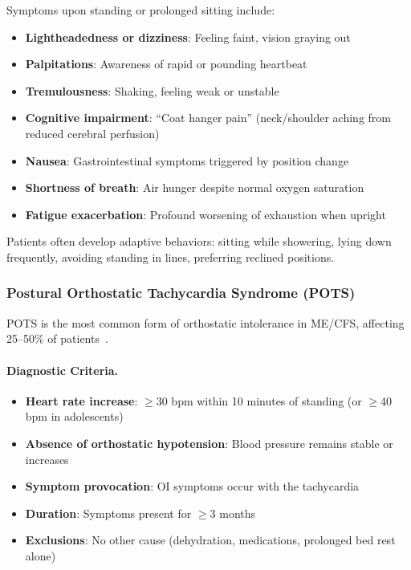 Symptoms upon standing or prolonged sitting include:
\begin{itemize}
    \item \textbf{Lightheadedness or dizziness}: Feeling faint, vision graying out
    \item \textbf{Palpitations}: Awareness of rapid or pounding heartbeat
    \item \textbf{Tremulousness}: Shaking, feeling weak or unstable
    \item \textbf{Cognitive impairment}: ``Coat hanger pain'' (neck/shoulder aching from reduced cerebral perfusion)
    \item \textbf{Nausea}: Gastrointestinal symptoms triggered by position change
    \item \textbf{Shortness of breath}: Air hunger despite normal oxygen saturation
    \item \textbf{Fatigue exacerbation}: Profound worsening of exhaustion when upright
\end{itemize}

Patients often develop adaptive behaviors: sitting while showering, lying down frequently, avoiding standing in lines, preferring reclined positions.

\subsubsection{Postural Orthostatic Tachycardia Syndrome (POTS)}

POTS is the most common form of orthostatic intolerance in ME/CFS, affecting 25--50\% of patients~\cite{Newton2008POTSprevalence}.

\paragraph{Diagnostic Criteria.}
\begin{itemize}
    \item \textbf{Heart rate increase}: $\geq$30 bpm within 10 minutes of standing (or $\geq$40 bpm in adolescents)~\cite{Sheldon2015POTScriteria}
    \item \textbf{Absence of orthostatic hypotension}: Blood pressure remains stable or increases
    \item \textbf{Symptom provocation}: OI symptoms occur with the tachycardia
    \item \textbf{Duration}: Symptoms present for $\geq$3 months
    \item \textbf{Exclusions}: No other cause (dehydration, medications, prolonged bed rest alone)
\end{itemize}

